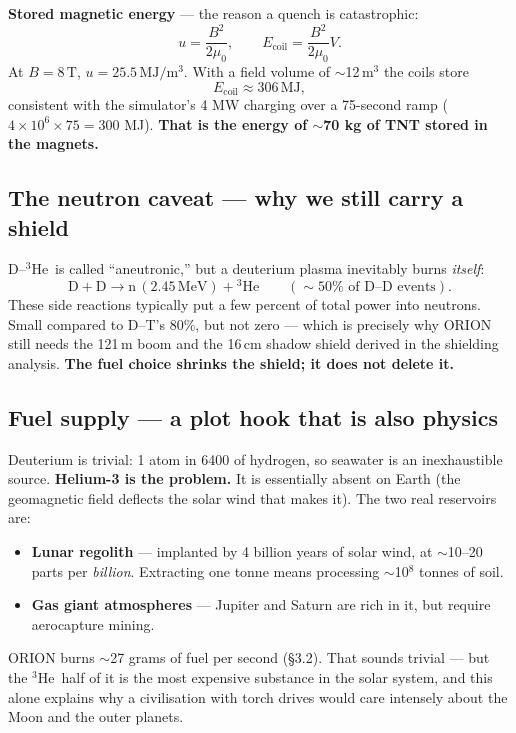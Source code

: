 \documentclass[11pt]{article}
\newcommand{\he}{\ensuremath{{}^3\mathrm{He}}}
\newcommand{\unit}[1]{\,\mathrm{#1}}
\begin{document}
\textbf{Stored magnetic energy} --- the reason a quench is catastrophic:
\begin{equation}
u=\frac{B^2}{2\mu_0}, \qquad E_{\text{coil}}=\frac{B^2}{2\mu_0}V .
\end{equation}
At $B=8\unit{T}$, $u=25.5\unit{MJ/m^3}$. With a field volume of $\sim$12\,m$^3$ the coils store
\begin{equation}
E_{\text{coil}} \approx 306\unit{MJ},
\end{equation}
consistent with the simulator's 4 MW charging over a 75-second ramp ($4\times10^6 \times 75 = 300$ MJ). \textbf{That is the energy of $\sim$70 kg of TNT stored in the magnets.}

\subsection{The neutron caveat --- why we still carry a shield}
D--\he\ is called ``aneutronic,'' but a deuterium plasma inevitably burns \emph{itself}:
\begin{equation}
\mathrm{D}+\mathrm{D}\to\mathrm{n}\,(2.45\unit{MeV})+\he \qquad(\sim50\%\text{ of D--D events}).
\end{equation}
These side reactions typically put a few percent of total power into neutrons. Small compared to D--T's 80\%, but not zero --- which is precisely why ORION still needs the 121\,m boom and the 16\,cm shadow shield derived in the shielding analysis. \textbf{The fuel choice shrinks the shield; it does not delete it.}

\subsection{Fuel supply --- a plot hook that is also physics}
Deuterium is trivial: 1 atom in 6400 of hydrogen, so seawater is an inexhaustible source. \textbf{Helium-3 is the problem.} It is essentially absent on Earth (the geomagnetic field deflects the solar wind that makes it). The two real reservoirs are:
\begin{itemize}\itemsep0pt
\item \textbf{Lunar regolith} --- implanted by 4 billion years of solar wind, at $\sim$10--20 parts per \emph{billion}. Extracting one tonne means processing $\sim$10$^8$ tonnes of soil.
\item \textbf{Gas giant atmospheres} --- Jupiter and Saturn are rich in it, but require aerocapture mining.
\end{itemize}
ORION burns $\sim$27 grams of fuel per second (\S3.2). That sounds trivial --- but the \he\ half of it is the most expensive substance in the solar system, and this alone explains why a civilisation with torch drives would care intensely about the Moon and the outer planets.
\end{document}

